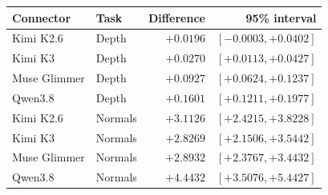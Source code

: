 \begin{tabular}{llrr}
\toprule
Connector & Task & Difference & 95\% interval\\
\midrule
Kimi K2.6 & Depth & $+0.0196$ & $[-0.0003, +0.0402]$\\
Kimi K3 & Depth & $+0.0270$ & $[+0.0113, +0.0427]$\\
Muse Glimmer & Depth & $+0.0927$ & $[+0.0624, +0.1237]$\\
Qwen3.8 & Depth & $+0.1601$ & $[+0.1211, +0.1977]$\\
Kimi K2.6 & Normals & $+3.1126$ & $[+2.4215, +3.8228]$\\
Kimi K3 & Normals & $+2.8269$ & $[+2.1506, +3.5442]$\\
Muse Glimmer & Normals & $+2.8932$ & $[+2.3767, +3.4432]$\\
Qwen3.8 & Normals & $+4.4432$ & $[+3.5076, +5.4427]$\\
\bottomrule
\end{tabular}
